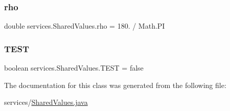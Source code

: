 \subsubsection{\texorpdfstring{rho}{rho}}
{\footnotesize\ttfamily double services.\+Shared\+Values.\+rho = 180. / Math.\+PI}

\mbox{\label{interfaceservices_1_1_shared_values_a549c2189db6344640733fa2591ba9048}} 
\subsubsection{\texorpdfstring{T\+E\+ST}{TEST}}
{\footnotesize\ttfamily boolean services.\+Shared\+Values.\+T\+E\+ST = false}



The documentation for this class was generated from the following file\+:\begin{DoxyCompactItemize}
\item 
services/\hyperlink{_shared_values_8java}{Shared\+Values.\+java}\end{DoxyCompactItemize}
